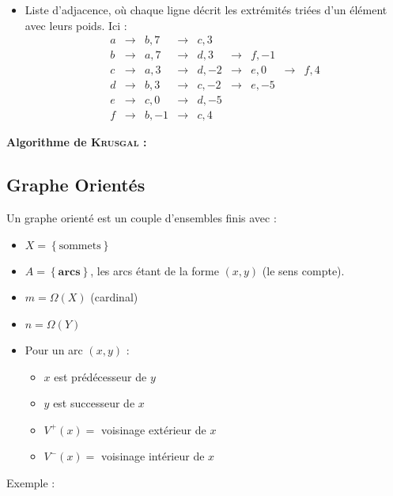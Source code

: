 \documentclass[a4paper, 8pt]{article}
\begin{document}
\begin{multicols*}{3}
\begin{itemize}
	\item Liste d'adjacence, où chaque ligne décrit les extrémités triées d'un élément avec leurs poids. Ici :
	\[\begin{smallmatrix}
	 a & \longrightarrow & b,7 & \longrightarrow & c,3 &  & &  &  \\ 
	 b & \longrightarrow & a,7 & \longrightarrow & d,3 & \longrightarrow & f,-1 &  &  \\ 
	 c & \longrightarrow & a,3 & \longrightarrow & d,-2 & \longrightarrow & e,0 & \longrightarrow & f,4 \\ 
	 d & \longrightarrow & b,3 & \longrightarrow & c,-2 & \longrightarrow & e,-5 &  &  \\ 
	 e & \longrightarrow & c,0 & \longrightarrow & d,-5 &  &  &  &  \\ 
	 f & \longrightarrow & b,-1 & \longrightarrow & c,4 &  &  &  & 
	 \end{smallmatrix}  \]
\end{itemize}
\textbf{Algorithme de \textsc{Krusgal} :}

\subsection*{Graphe Orientés}
Un graphe orienté \GXA est un couple d'ensembles finis avec :
\begin{itemize}
\item $X = \left\{\text{sommets}\right\}$
\item $A = \left\{\mathbf{arcs}\right\}$, les arcs étant de la forme $(x,y)$ (le sens compte).
\item $m = \Omega(X)$ (cardinal)
\item $n = \Omega(Y)$
\item Pour un arc $(x,y)$ :
	\begin{itemize}
	\item $x$ est prédécesseur de $y$
	\item $y$ est successeur de $x$
	\item $V^+(x) =$ voisinage extérieur de $x$
	\item $V^-(x) =$ voisinage intérieur de $x$
	\end{itemize}
\end{itemize}
\medskip
Exemple :
\begin{center}
\end{center}
\end{multicols*}
\end{document}
